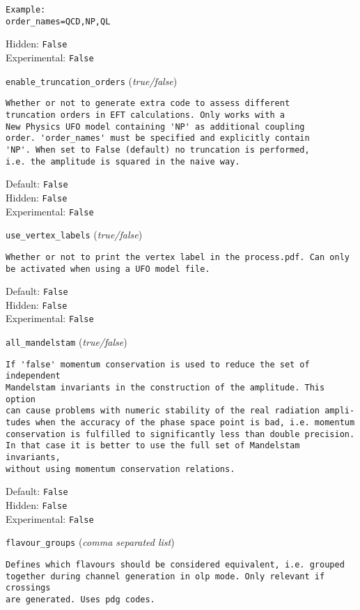 \begin{basedescript}{\desclabelstyle{\pushlabel}}
\begin{verbatim}
Example:
order_names=QCD,NP,QL
\end{verbatim}
Hidden: \verb|False|
\\Experimental: \verb|False|
\\\item[\colorbox{gray!30}{\texttt{enable\_truncation\_orders}}] (\textit{true/false})
\begin{verbatim}
Whether or not to generate extra code to assess different
truncation orders in EFT calculations. Only works with a
New Physics UFO model containing 'NP' as additional coupling
order. 'order_names' must be specified and explicitly contain
'NP'. When set to False (default) no truncation is performed,
i.e. the amplitude is squared in the naive way.
\end{verbatim}
Default: \verb|False|
\\Hidden: \verb|False|
\\Experimental: \verb|False|
\\\item[\colorbox{gray!30}{\texttt{use\_vertex\_labels}}] (\textit{true/false})
\begin{verbatim}
Whether or not to print the vertex label in the process.pdf. Can only
be activated when using a UFO model file.
\end{verbatim}
Default: \verb|False|
\\Hidden: \verb|False|
\\Experimental: \verb|False|
\\\item[\colorbox{gray!30}{\texttt{all\_mandelstam}}] (\textit{true/false})
\begin{verbatim}
If 'false' momentum conservation is used to reduce the set of independent
Mandelstam invariants in the construction of the amplitude. This option
can cause problems with numeric stability of the real radiation ampli-
tudes when the accuracy of the phase space point is bad, i.e. momentum
conservation is fulfilled to significantly less than double precision.
In that case it is better to use the full set of Mandelstam invariants,
without using momentum conservation relations.
\end{verbatim}
Default: \verb|False|
\\Hidden: \verb|False|
\\Experimental: \verb|False|
\\\item[\colorbox{gray!30}{\texttt{flavour\_groups}}] (\textit{comma separated list})
\begin{verbatim}
Defines which flavours should be considered equivalent, i.e. grouped
together during channel generation in olp mode. Only relevant if crossings
are generated. Uses pdg codes.


\end{verbatim}
\end{basedescript}

